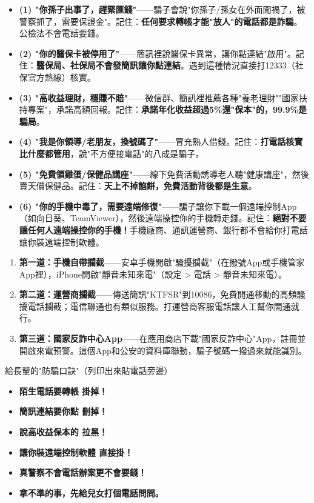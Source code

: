 \begin{itemize}
  \item \textbf{(1) "你孫子出事了，趕緊匯錢"}——騙子會說"你孫子/孫女在外面闖禍了，被警察抓了，需要保證金"。記住：\textbf{任何要求轉帳才能"放人"的電話都是詐騙}。公檢法不會電話要錢。
  \item \textbf{(2) "你的醫保卡被停用了"}——簡訊裡說醫保卡異常，讓你點連結"啟用"。記住：\textbf{醫保局、社保局不會發簡訊讓你點連結}。遇到這種情況直接打12333（社保官方熱線）核實。
  \item \textbf{(3) "高收益理財，穩賺不賠"}——微信群、簡訊裡推薦各種"養老理財""國家扶持專案"，承諾高額回報。記住：\textbf{承諾年化收益超過5\%還"保本"的，99.9\%是騙局}。
  \item \textbf{(4) "我是你領導/老朋友，換號碼了"}——冒充熟人借錢。記住：\textbf{打電話核實比什麼都管用}，說"不方便接電話"的八成是騙子。
  \item \textbf{(5) "免費領雞蛋/保健品講座"}——線下免費活動誘導老人聽"健康講座"，然後賣天價保健品。記住：\textbf{天上不掉餡餅，免費活動背後都是生意}。
  \item \textbf{(6) "你的手機中毒了，需要遠端修復"}——騙子讓你下載一個遠端控制App（如向日葵、TeamViewer），然後遠端操控你的手機轉走錢。記住：\textbf{絕對不要讓任何人遠端操控你的手機！}手機廠商、通訊運營商、銀行都不會給你打電話讓你裝遠端控制軟體。
\end{itemize}


\begin{enumerate}
  \item \textbf{第一道：手機自帶攔截}——安卓手機開啟"騷擾攔截"（在撥號App或手機管家App裡），iPhone開啟"靜音未知來電"（設定 > 電話 > 靜音未知來電）。
  \item \textbf{第二道：運營商攔截}——傳送簡訊"KTFSR"到10086，免費開通移動的高頻騷擾電話攔截；電信聯通也有類似服務。打運營商客服電話讓人工幫你開通就行。
  \item \textbf{第三道：國家反詐中心App}——在應用商店下載"國家反詐中心"App，註冊並開啟來電預警。這個App和公安的資料庫聯動，騙子號碼一撥過來就能識別。
\end{enumerate}

\begin{tcbwarn}{給長輩的"防騙口訣"（列印出來貼電話旁邊）}
\begin{itemize}
  \item \textbf{陌生電話要轉帳 掛掉！}
  \item \textbf{簡訊連結要你點 刪掉！}
  \item \textbf{說高收益保本的 拉黑！}
  \item \textbf{讓你裝遠端控制軟體 直接掛！}
  \item \textbf{真警察不會電話辦案更不會要錢！}
  \item \textbf{拿不準的事，先給兒女打個電話問問。}
\end{itemize}

\end{tcbwarn}

